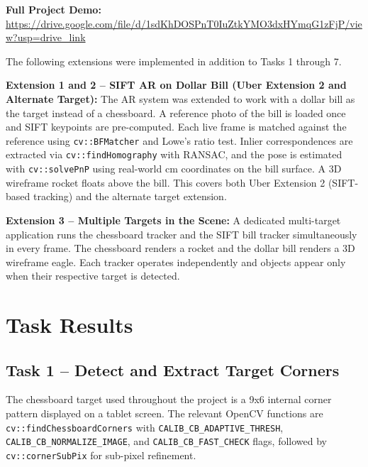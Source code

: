 \documentclass[11pt]{article}
\begin{document}
\textbf{Full Project Demo:} \\
\url{https://drive.google.com/file/d/1sdKhDOSPnT0IuZtkYMO3dxHYmqG1zFjP/view?usp=drive_link}

\newpage

The following extensions were implemented in addition to Tasks 1 through 7.

\textbf{Extension 1 and 2 -- SIFT AR on Dollar Bill (Uber Extension 2 and Alternate Target):}
The AR system was extended to work with a dollar bill as the target instead of a chessboard. A reference photo of the bill is loaded once and SIFT keypoints are pre-computed. Each live frame is matched against the reference using \texttt{cv::BFMatcher} and Lowe's ratio test. Inlier correspondences are extracted via \texttt{cv::findHomography} with RANSAC, and the pose is estimated with \texttt{cv::solvePnP} using real-world cm coordinates on the bill surface. A 3D wireframe rocket floats above the bill. This covers both Uber Extension 2 (SIFT-based tracking) and the alternate target extension.

\textbf{Extension 3 -- Multiple Targets in the Scene:}
A dedicated multi-target application runs the chessboard tracker and the SIFT bill tracker simultaneously in every frame. The chessboard renders a rocket and the dollar bill renders a 3D wireframe eagle. Each tracker operates independently and objects appear only when their respective target is detected.

\newpage

\section{Task Results}

\subsection{Task 1 -- Detect and Extract Target Corners}

The chessboard target used throughout the project is a 9x6 internal corner pattern displayed on a tablet screen. The relevant OpenCV functions are \texttt{cv::findChessboardCorners} with \texttt{CALIB\_CB\_ADAPTIVE\_THRESH}, \texttt{CALIB\_CB\_NORMALIZE\_IMAGE}, and \texttt{CALIB\_CB\_FAST\_CHECK} flags, followed by \texttt{cv::cornerSubPix} for sub-pixel refinement.
\end{document}
